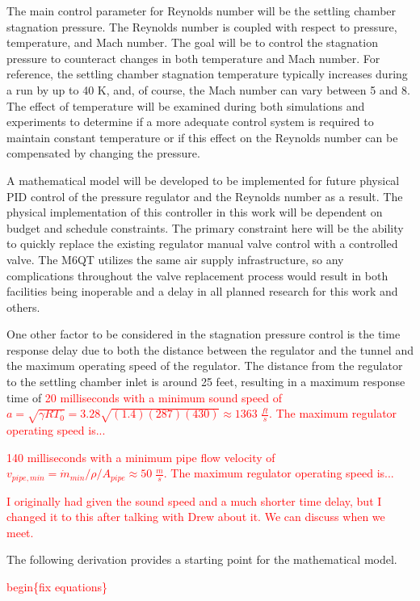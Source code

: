 The main control parameter for Reynolds number will be the settling chamber stagnation pressure. The Reynolds number is coupled with respect to pressure, temperature, and Mach number. The goal will be to control the stagnation pressure to counteract changes in both temperature and Mach number. For reference, the settling chamber stagnation temperature typically increases during a run by up to 40 K, and, of course, the Mach number can vary between 5 and 8. The effect of temperature will be examined during both simulations and experiments to determine if a more adequate control system is required to maintain constant temperature or if this effect on the Reynolds number can be compensated by changing the pressure.

A mathematical model will be developed to be implemented for future physical PID control of the pressure regulator and the Reynolds number as a result. The physical implementation of this controller in this work will be dependent on budget and schedule constraints. The primary constraint here will be the ability to quickly replace the existing regulator manual valve control with a controlled valve. The M6QT utilizes the same air supply infrastructure, so any complications throughout the valve replacement process would result in both facilities being inoperable and a delay in all planned research for this work and others.

One other factor to be considered in the stagnation pressure control is the time response delay due to both the distance between the regulator and the tunnel and the maximum operating speed of the regulator. The distance from the regulator to the settling chamber inlet is around 25 feet, resulting in a maximum response time of \textcolor{red}{20 milliseconds with a minimum sound speed of $a = \sqrt{\gamma R T_0} = 3.28\sqrt{(1.4)(287)(430)} \approx 1363 \; \frac{ft}{s}$. The maximum regulator operating speed is...}

\textcolor{red}{140 milliseconds with a minimum pipe flow velocity of $v_{pipe,min} = \dot{m}_{min}/\rho/A_{pipe} \approx 50 \; \frac{m}{s}$. The maximum regulator operating speed is...}

\textcolor{red}{I originally had given the sound speed and a much shorter time delay, but I changed it to this after talking with Drew about it. We can discuss when we meet.}

The following derivation provides a starting point for the mathematical model.

\textcolor{red}{begin\{fix equations\}}

